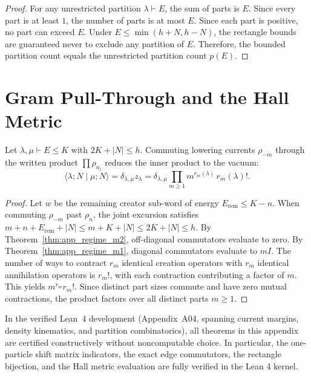 \begin{proof}
For any unrestricted partition $\lambda \vdash E$, the sum of parts is $E$. Since every part is at least $1$, the number of parts is at most $E$. Since each part is positive, no part can exceed $E$.
Under $E \le \min(h+N, h-N)$, the rectangle bounds are guaranteed never to exclude any partition of $E$.
Therefore, the bounded partition count equals the unrestricted partition count $p(E)$.
\end{proof}

\section{Gram Pull-Through and the Hall Metric}

\begin{theorem}
\label{thm:app_hall_normalization}
Let $\lambda, \mu \vdash E \le K$ with $2K + |N| \le h$.
Commuting lowering currents $\rho_{-m}$ through the written product $\prod \rho_{n_i}$ reduces the inner product to the vacuum:
\begin{equation}
\langle \lambda; N \mid \mu; N \rangle = \delta_{\lambda, \mu} z_\lambda = \delta_{\lambda, \mu} \prod_{m \ge 1} m^{r_m(\lambda)}\, r_m(\lambda)!.
\end{equation}
\end{theorem}

\begin{proof}
Let $w$ be the remaining creator sub-word of energy $E_{\mathrm{rem}} \le K - n$.
When commuting $\rho_{-m}$ past $\rho_n$, the joint excursion satisfies $m + n + E_{\mathrm{rem}} + |N| \le m + K + |N| \le 2K + |N| \le h$.
By Theorem~\ref{thm:app_regime_m2}, off-diagonal commutators evaluate to zero.
By Theorem~\ref{thm:app_regime_m1}, diagonal commutators evaluate to $m I$.
The number of ways to contract $r_m$ identical creation operators with $r_m$ identical annihilation operators is $r_m!$, with each contraction contributing a factor of $m$.
This yields $m^{r_m} r_m!$.
Since distinct part sizes commute and have zero mutual contractions, the product factors over all distinct parts $m \ge 1$.
\end{proof}

\begin{remark}
In the verified Lean~4 development (Appendix~A04, spanning current margins, density kinematics, and partition combinatorics), all theorems in this appendix are certified constructively without noncomputable choice. In particular, the one-particle shift matrix indicators, the exact edge commutators, the rectangle bijection, and the Hall metric evaluation are fully verified in the Lean 4 kernel.
\end{remark}
